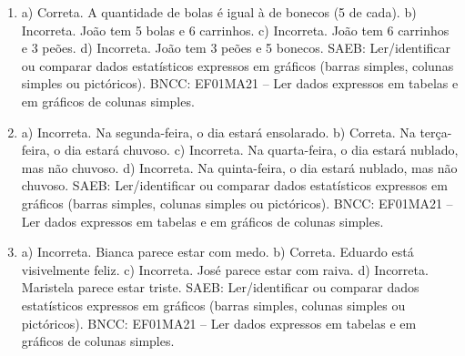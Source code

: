 \begin{enumerate}
\item
a) Correta. A quantidade de bolas é igual à de bonecos (5 de cada).
b) Incorreta. João tem 5 bolas e 6 carrinhos.
c) Incorreta. João tem 6 carrinhos e 3 peões.
d) Incorreta. João tem 3 peões e 5 bonecos.
SAEB: Ler/identificar ou comparar dados estatísticos expressos
em gráficos (barras simples, colunas simples ou pictóricos).
BNCC: EF01MA21 -- Ler dados expressos em tabelas e em gráficos de colunas
simples.

\item
a) Incorreta. Na segunda-feira, o dia estará ensolarado.
b) Correta. Na terça-feira, o dia estará chuvoso.
c) Incorreta. Na quarta-feira, o dia estará nublado, mas não chuvoso.
d) Incorreta. Na quinta-feira, o dia estará nublado, mas não chuvoso.
SAEB: Ler/identificar ou comparar dados estatísticos expressos
em gráficos (barras simples, colunas simples ou pictóricos).
BNCC: EF01MA21  -- Ler dados expressos em tabelas e em gráficos de colunas
simples.

\item
a) Incorreta. Bianca parece estar com medo.
b) Correta. Eduardo está visivelmente feliz.
c) Incorreta. José parece estar com raiva.
d) Incorreta. Maristela parece estar triste.
SAEB: Ler/identificar ou comparar dados estatísticos expressos
em gráficos (barras simples, colunas simples ou pictóricos).
BNCC: EF01MA21 -- Ler dados expressos em tabelas e em gráficos de colunas
simples.
\end{enumerate}


